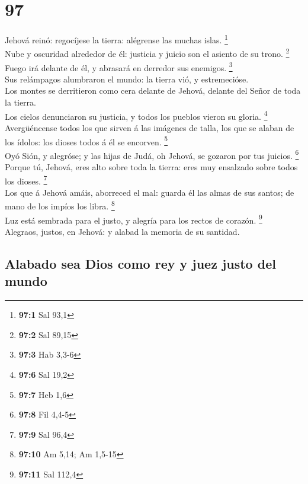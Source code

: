 \hypertarget{section-96}{%
\section{97}\label{section-96}}

 Jehová reinó: regocíjese la tierra: alégrense las muchas
islas. \footnote{\textbf{97:1} Sal 93,1}\\
 Nube y oscuridad alrededor de él: justicia y juicio son el
asiento de su trono. \footnote{\textbf{97:2} Sal 89,15}\\
 Fuego irá delante de él, y abrasará en derredor sus
enemigos. \footnote{\textbf{97:3} Hab 3,3-6}\\
 Sus relámpagos alumbraron el mundo: la tierra vió, y
estremecióse.\\
 Los montes se derritieron como cera delante de Jehová,
delante del Señor de toda la tierra.\\
 Los cielos denunciaron su justicia, y todos los pueblos
vieron su gloria. \footnote{\textbf{97:6} Sal 19,2}\\
 Avergüéncense todos los que sirven á las imágenes de talla,
los que se alaban de los ídolos: los dioses todos á él se encorven.
\footnote{\textbf{97:7} Heb 1,6}\\
 Oyó Sión, y alegróse; y las hijas de Judá, oh Jehová, se
gozaron por tus juicios. \footnote{\textbf{97:8} Fil 4,4-5}\\
 Porque tú, Jehová, eres alto sobre toda la tierra: eres muy
ensalzado sobre todos los dioses. \footnote{\textbf{97:9} Sal 96,4}\\
 Los que á Jehová amáis, aborreced el mal: guarda él las
almas de sus santos; de mano de los impíos los libra. \footnote{\textbf{97:10}
  Am 5,14; Am 1,5-15}\\
 Luz está sembrada para el justo, y alegría para los rectos
de corazón. \footnote{\textbf{97:11} Sal 112,4}\\
 Alegraos, justos, en Jehová: y alabad la memoria de su
santidad.

\hypertarget{alabado-sea-dios-como-rey-y-juez-justo-del-mundo}{%
\subsection{Alabado sea Dios como rey y juez justo del
mundo}\label{alabado-sea-dios-como-rey-y-juez-justo-del-mundo}}


